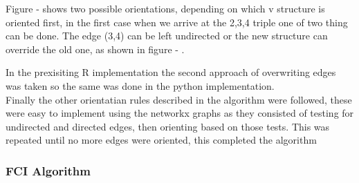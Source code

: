 \documentclass{article}
\begin{document}
\begin{center}
\end{center}

Figure - shows two possible orientations, depending on which v structure is oriented first, in the first case when we arrive at the 2,3,4 triple one of two thing can be done. The edge (3,4) can be left undirected or the new structure can override the old one, as shown in figure - .\\

\begin{center}
\end{center}

In the prexisiting R implementation the second approach of overwriting edges was taken so the same was done in the python implementation.\\

Finally the other orientatian rules described in the algorithm were followed, these were easy to implement using the networkx graphs as they consisted of testing for undirected and directed edges, then orienting based on those tests. This was repeated until no more edges were oriented, this completed the algorithm

\subsubsection{FCI Algorithm}
\end{document}
